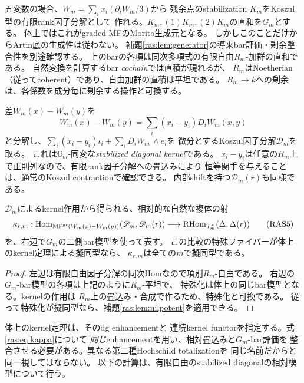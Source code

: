 五変数の場合、$W_m=\sum_i x_i(\partial_iW_m/3)$から
残余点のstabilization $K_m$をKoszul型の有限rank因子分解として
作れる。$K_m,(1)K_m,(2)K_m$の直和を$G_m$とする。
体上ではこれがgraded MFのMorita生成元となる\cite{RASDyck,RASBFK}。
しかしこのことだけからArtin底の生成性は従わない。
補題\ref{ras:lem:generator}の導来bar評価・剰余整合性を別途確認する。
上のbarの各項は同次多項式の有限自由$R_m$-加群の直和である。
自然変換を計算するbar \emph{cochain}では直積が現れるが、
$R_m$はNoetherian（従ってcoherent）であり、自由加群の直積は平坦である。
$R_m\to k$への剰余は、各係数を成分毎に剰余する操作と可換する。

差$W_m(x)-W_m(y)$を
\[
 W_m(x)-W_m(y)=\sum_i(x_i-y_i)D_iW_m(x,y)
\]
と分解し、$\sum_i(x_i-y_i)\iota_i+\sum_iD_iW_m\,\wedge e_i$を
微分とするKoszul因子分解$\mathscr D_m$を取る。
これは$\mathbb G_m$-同変な\emph{stabilized diagonal kernel}である。
$x_i-y_i$は任意の$R_m$上で正則列なので、有限rank因子分解への畳込みにより
恒等関手を与えることは、通常のKoszul contractionで確認できる。
内部shiftを持つ$\mathscr D_m(r)$も同様である。

\begin{proposition}[相対kernel作用のnilpotent検出]\label{ras:prop:kernel-action}
$\mathscr D_m$によるkernel作用から得られる、相対的な自然な複体の射
\[
 \kappa_{r,m}:\operatorname{Hom}_{\mathrm{MF}^{\rm gr}(W_m(x)-W_m(y))}
 (\mathscr D_m,\mathscr D_m(r))
 \longrightarrow
 \operatorname{RHom}_{\mathcal T_m^e}(\Delta,\Delta(r))
 \tag{RAS5}\label{ras:eq:kappa}
\]
を、右辺で$G_m$の二側bar模型を使って表す。
この比較の特殊ファイバーが体上のkernel定理による擬同型なら、
$\kappa_{r,m}$は全ての$m$で擬同型である。
\end{proposition}
\begin{proof}
左辺は有限自由因子分解の同次Homなので項別$R_m$-自由である。
右辺の$G_m$-bar模型の各項は上記のように$R_m$-平坦で、
特殊化は体上の同じbar模型となる。kernelの作用は
$R_m$上の畳込み・合成で作るため、特殊化と可換である。
従って特殊化が擬同型なら、補題\ref{ras:lem:nilpotent}を適用できる。
\end{proof}

\begin{remark}[比較の適用範囲]
体上のkernel定理\cite{RASBFK}は、そのdg enhancementと
連続kernel functorを指定する。式\eqref{ras:eq:kappa}について
\emph{同じ}enhancementを用い、相対畳込みと$G_m$-bar評価を
整合させる必要がある。異なる第二種Hochschild totalizationを
同じ名前だからと同一視してはならない。
以下の計算は、有限自由のstabilized diagonalの相対模型について行う。
\end{remark}

